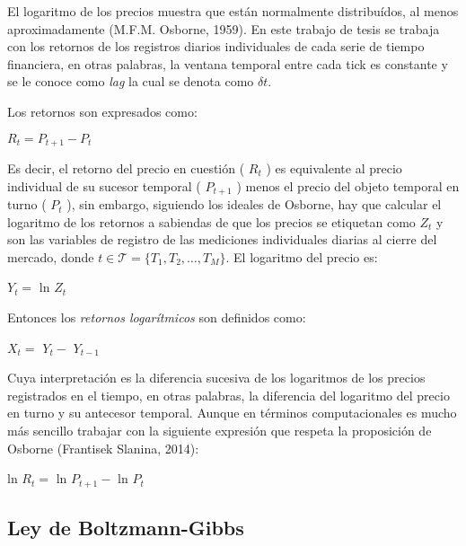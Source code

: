 El logaritmo de los precios muestra que están normalmente distribuídos, al menos aproximadamente (M.F.M. Osborne, 1959). En este trabajo de tesis se trabaja con los retornos de los registros diarios individuales de cada serie de tiempo financiera, en otras palabras, la ventana temporal entre cada \guillemotleft tick \guillemotright es constante y se le conoce como \textit{lag} la cual se denota como $\delta t$. 
\newline

Los retornos son expresados como:
\begin{center}
$R_t=P_{t+1}-P_t$
\end{center}
Es decir, el retorno del precio en cuestión ( $R_t$ ) es equivalente al precio individual de su sucesor temporal ( $P_{t+1}$ ) menos el precio del objeto temporal en turno ( $P_t$ ), sin embargo, siguiendo los ideales de Osborne, hay que calcular el logaritmo de los retornos a sabiendas de que los precios se etiquetan como $\mathit{Z_t}$ y son las variables de registro de las mediciones individuales diarias al cierre del mercado, donde \newline $t \in \mathcal{T} = \{\mathit{T_1,T_2,\ldots , T_M}\}$. El logaritmo del precio es:

\begin{center}
$\mathit{Y_{t}} = $ ln $\mathit{Z_{t}}$
\end{center}

Entonces los \textit{retornos logarítmicos} son definidos como: 

\begin{center}
$X_t = $ $\mathit{Y_{t}} - $  $\mathit{Y_{t - 1}}$
\end{center}

Cuya interpretación es la diferencia sucesiva de los logaritmos de los precios  registrados en el tiempo, en otras palabras, la diferencia del logaritmo del precio en turno y su antecesor temporal. Aunque en términos computacionales es mucho más sencillo trabajar con la siguiente expresión que respeta la proposición de Osborne (Frantisek Slanina, 2014): 
\begin{center}
ln $R_t = $ ln $\mathit{P_{t+1}} - $ ln $\mathit{P_{t}}$
\end{center}%


\subsection{Ley de Boltzmann-Gibbs} 

